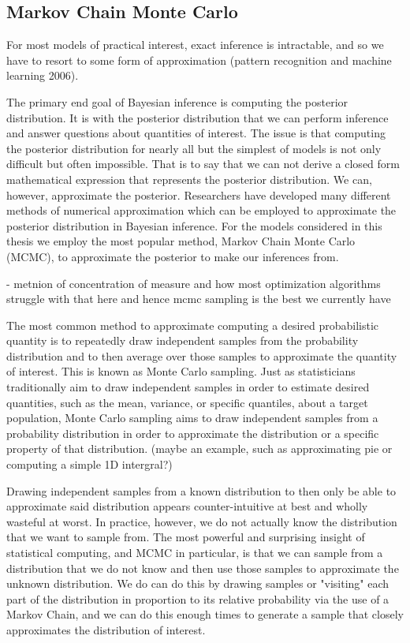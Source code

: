 \subsection{Markov Chain Monte Carlo}

For most models of practical interest, exact inference is intractable, and so we have to resort to some form of approximation (pattern recognition and machine learning 2006).

The primary end goal of Bayesian inference is computing the posterior distribution. It is with the posterior distribution that we can perform inference and answer questions about quantities of interest. The issue is that computing the posterior distribution for nearly all but the simplest of models is not only difficult but often impossible. That is to say that we can not derive a closed form mathematical expression that represents the posterior distribution. We can, however, approximate the posterior. Researchers have developed many different methods of numerical approximation which can be employed to approximate the posterior distribution in Bayesian inference. For the models considered in this thesis we employ the most popular method, Markov Chain Monte Carlo (MCMC), to approximate the posterior to make our inferences from.

- metnion of concentration of measure and how most optimization algorithms struggle with that here and hence mcmc sampling is the best we currently have

The most common method to approximate computing a desired probabilistic quantity is to repeatedly draw independent samples from the probability distribution and to then average over those samples to approximate the quantity of interest. This is known as Monte Carlo sampling.  Just as statisticians traditionally aim to draw independent samples in order to estimate desired quantities, such as the mean, variance, or specific quantiles, about a target population, Monte Carlo sampling aims to draw independent samples from a probability distribution in order to approximate the distribution or a specific property of that distribution. (maybe an example, such as approximating pie or computing a simple 1D intergral?)

Drawing independent samples from a known distribution to then only be able to approximate said distribution appears counter-intuitive at best and wholly wasteful at worst. In practice, however, we do not actually know the distribution that we want to sample from. The most powerful and surprising insight of statistical computing, and MCMC in particular, is that we can sample from a distribution that we do not know and then use those samples to approximate the unknown distribution. We do can do this by drawing samples or "visiting" each part of the distribution in proportion to its relative probability via the use of a Markov Chain, and we can do this enough times to generate a sample that closely approximates the distribution of interest.

